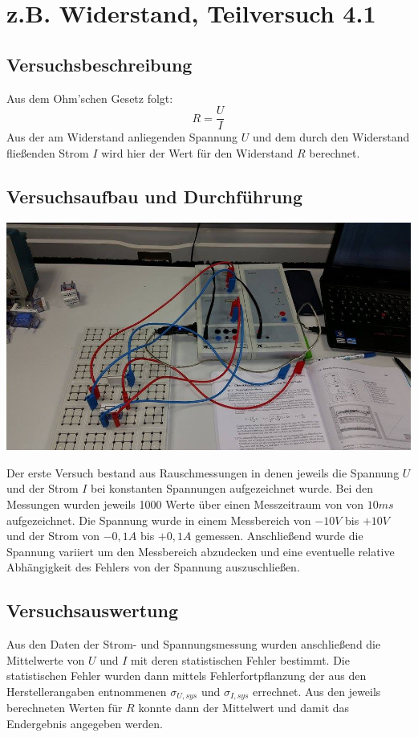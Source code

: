 \documentclass[12pt,a4paper]{article}
\author{Gruppe C14 \\ Julián Häck, Martin Koytek, Lars Wenning, Erik Zimmermann}
\begin{document}
\section{z.B. Widerstand, Teilversuch 4.1}
\subsection{Versuchsbeschreibung}
Aus dem Ohm'schen Gesetz folgt:
\[R=\frac{U}{I}\]
Aus der am Widerstand anliegenden Spannung $U$ und dem durch den Widerstand fließenden Strom $I$ wird hier der Wert für den Widerstand $R$ berechnet.
\subsection{Versuchsaufbau und Durchführung}
\begin{center}
\includegraphics[scale=0.35]{12000155_1207085929316467_1534534399_n.jpg}
\end{center}

Der erste Versuch bestand aus Rauschmessungen in denen jeweils die Spannung $U$ und der Strom $I$ bei konstanten Spannungen aufgezeichnet wurde.
Bei den Messungen wurden jeweils 1000 Werte über einen Messzeitraum von von $10ms$ aufgezeichnet. Die Spannung wurde in einem Messbereich von $-10V$ bis $+10V$ und der Strom von $-0,1A$ bis $+0,1A$ gemessen.
Anschließend wurde die Spannung variiert um den Messbereich abzudecken und eine eventuelle relative Abhängigkeit des Fehlers von der Spannung auszuschließen. 

\subsection{Versuchsauswertung}
Aus den Daten der Strom- und Spannungsmessung wurden anschließend die Mittelwerte von $U$ und $I$ mit deren statistischen Fehler bestimmt.
Die statistischen Fehler wurden dann mittels Fehlerfortpflanzung der aus den Herstellerangaben entnommenen $\sigma_{U,sys}$ und $\sigma_{I,sys}$ errechnet. 
Aus den jeweils berechneten Werten für $R$ konnte dann der Mittelwert und damit das Endergebnis angegeben werden.
\end{document}
